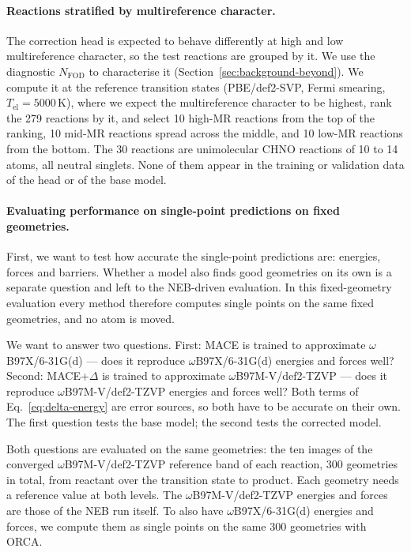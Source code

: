 \paragraph{Reactions stratified by multireference character.}
The correction head is expected to behave differently at high and low
multireference character, so the test reactions are grouped by it.
We use the diagnostic $N_{\mathrm{FOD}}$ to characterise it
(Section~\ref{sec:background-beyond}). We compute it at the
reference transition states (PBE/def2-SVP, Fermi smearing,
$T_{\mathrm{el}} = 5000$\,K), where we expect
the multireference character to be highest, rank the 279 reactions by it,
and select 10 high-MR reactions from the top of the ranking, 10 mid-MR
reactions spread across the middle, and 10 low-MR reactions from the
bottom. The 30 reactions are unimolecular CHNO reactions of 10 to 14 atoms,
all neutral singlets. None of them appear in the training or validation
data of the head or of the base model.

\paragraph{Evaluating performance on single-point predictions on fixed geometries.}
First, we want to test how accurate the single-point predictions are: energies, forces and
barriers. Whether a model also finds good geometries on its own is a
separate question and left to the NEB-driven evaluation. In this
fixed-geometry evaluation every method therefore computes single
points on the same fixed geometries, and no atom is moved.

We want to answer two questions. First: MACE is trained to approximate
$\omega$B97X/6-31G(d) --- does it reproduce $\omega$B97X/6-31G(d) energies and forces well?
Second: MACE+$\Delta$ is trained to approximate $\omega$B97M-V/def2-TZVP --- does
it reproduce $\omega$B97M-V/def2-TZVP energies and forces well? Both terms of
Eq.~\eqref{eq:delta-energy} are error sources, so both have to be
accurate on their own. The first question tests the base model; the
second tests the corrected model.

Both questions are evaluated on the same geometries: the ten images
of the converged $\omega$B97M-V/def2-TZVP reference band of each
reaction, 300 geometries in total, from reactant over the transition
state to product. Each geometry needs a reference value at both
levels. The $\omega$B97M-V/def2-TZVP energies and forces are those
of the NEB run itself. To also have $\omega$B97X/6-31G(d) energies
and forces, we compute them as single points on the same 300
geometries with ORCA.


